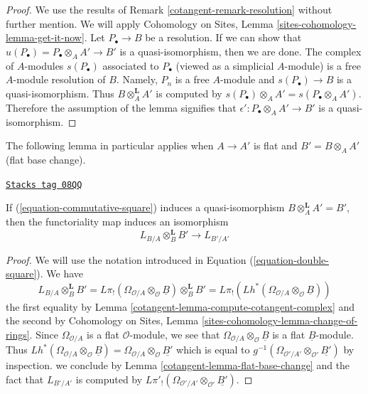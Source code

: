\begin{proof}

We use the results of Remark \ref{cotangent-remark-resolution} without
further mention. We will apply Cohomology on Sites, Lemma
\ref{sites-cohomology-lemma-get-it-now}. Let $P_\bullet \to B$ be a resolution.
If we can show that $u(P_\bullet) = P_\bullet \otimes_A A' \to B'$
is a quasi-isomorphism, then we are done. The complex of $A$-modules
$s(P_\bullet)$ associated to $P_\bullet$ (viewed as a simplicial $A$-module)
is a free $A$-module resolution of $B$. Namely, $P_n$ is a free $A$-module and
$s(P_\bullet) \to B$ is a quasi-isomorphism. Thus $B \otimes_A^\mathbf{L} A'$
is computed by $s(P_\bullet) \otimes_A A' = s(P_\bullet \otimes_A A')$.
Therefore the assumption of the lemma signifies that
$\epsilon' : P_\bullet \otimes_A A' \to B'$ is a quasi-isomorphism.
\end{proof}

The following lemma in particular applies when $A \to A'$ is flat
and $B' = B \otimes_A A'$ (flat base change).

\begin{lemma}
\label{cotangent-lemma-flat-base-change-cotangent-complex}
\href{https://stacks.math.columbia.edu/tag/08QQ}{\texttt{Stacks tag 08QQ}}

If (\ref{equation-commutative-square}) induces a quasi-isomorphism
$B \otimes_A^\mathbf{L} A' = B'$, then the functoriality map
induces an isomorphism
$$
L_{B/A} \otimes_B^\mathbf{L} B' \longrightarrow L_{B'/A'}
$$
\end{lemma}

\begin{proof}

We will use the notation introduced in Equation (\ref{equation-double-square}).
We have
$$
L_{B/A} \otimes_B^\mathbf{L} B' =
L\pi_!(\Omega_{\mathcal{O}/A} \otimes_\mathcal{O} \underline{B})
\otimes_B^\mathbf{L} B' =
L\pi_!(Lh^*(\Omega_{\mathcal{O}/A} \otimes_\mathcal{O} \underline{B}))
$$
the first equality by Lemma \ref{cotangent-lemma-compute-cotangent-complex}
and the second by Cohomology on Sites, Lemma
\ref{sites-cohomology-lemma-change-of-rings}.
Since $\Omega_{\mathcal{O}/A}$ is a flat $\mathcal{O}$-module,
we see that $\Omega_{\mathcal{O}/A} \otimes_\mathcal{O} \underline{B}$
is a flat $\underline{B}$-module. Thus
$Lh^*(\Omega_{\mathcal{O}/A} \otimes_\mathcal{O} \underline{B}) =
\Omega_{\mathcal{O}/A} \otimes_\mathcal{O} \underline{B'}$
which is equal to
$g^{-1}(\Omega_{\mathcal{O}'/A'} \otimes_{\mathcal{O}'} \underline{B'})$
by inspection.
we conclude by Lemma \ref{cotangent-lemma-flat-base-change}
and the fact that $L_{B'/A'}$ is computed by
$L\pi'_!(\Omega_{\mathcal{O}'/A'} \otimes_{\mathcal{O}'} \underline{B'})$.
\end{proof}

